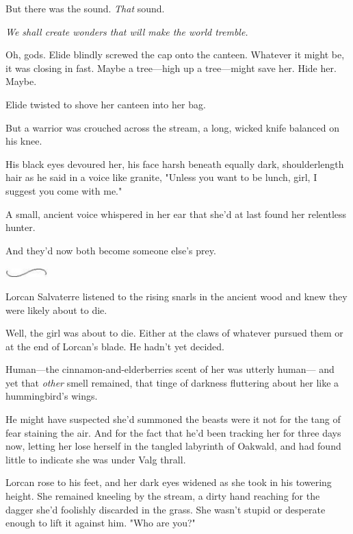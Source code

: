 But there was the sound.
\emph{That} sound.

\emph{We shall create wonders that will make the world tremble.}

Oh, gods.
Elide blindly screwed the cap onto the canteen.
Whatever it might be, it was closing in fast.
Maybe a tree---high up a tree---might save her.
Hide her.
Maybe.

Elide twisted to shove her canteen into her bag.

But a warrior was crouched across the stream, a long, wicked knife balanced on his knee.

His black eyes devoured her, his face harsh beneath equally dark, shoulderlength hair as he said in a voice like granite, "Unless you want to be lunch, girl, I suggest you come with me."

A small, ancient voice whispered in her ear that she'd at last found her relentless hunter.

And they'd now both become someone else's prey.

\begin{center}
	\includegraphics[width=0.65in,height=0.13in]{images/seperator}
\end{center}

Lorcan Salvaterre listened to the rising snarls in the ancient wood and knew they were likely about to die.

Well, the girl was about to die.
Either at the claws of whatever pursued them or at the end of Lorcan's blade.
He hadn't yet decided.

Human---the cinnamon-and-elderberries scent of her was utterly human--- and yet that \emph{other} smell remained, that tinge of darkness fluttering about her like a hummingbird's wings.

He might have suspected she'd summoned the beasts were it not for the tang of fear staining the air.
And for the fact that he'd been tracking her for three days now, letting her lose herself in the tangled labyrinth of Oakwald, and had found little to indicate she was under Valg thrall.

Lorcan rose to his feet, and her dark eyes widened as she took in his towering height.
She remained kneeling by the stream, a dirty hand reaching for the dagger she'd foolishly discarded in the grass.
She wasn't stupid or desperate enough to lift it against him.
"Who are you?"

